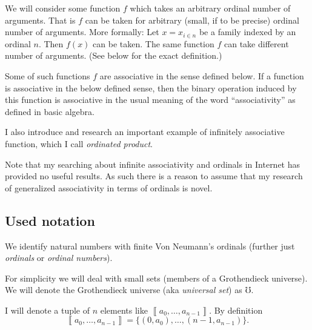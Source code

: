 We will consider some function $f$ which takes an arbitrary ordinal
number of arguments. That is $f$ can be taken for arbitrary (small,
if to be precise) ordinal number of arguments. More formally: Let
$x=x_{i\in n}$ be a family indexed by an ordinal $n$. Then $f(x)$
can be taken. The same function $f$ can take different number of
arguments. (See below for the exact definition.)

Some of such functions $f$ are associative in the sense defined below.
If a function is associative in the below defined sense, then the
binary operation induced by this function is associative in the usual
meaning of the word ``associativity'' as defined in basic algebra.

I also introduce and research an important example of infinitely associative
function, which I call \emph{ordinated product}.

Note that my searching about infinite associativity and ordinals in
Internet has provided no useful results. As such there is a reason
to assume that my research of generalized associativity in terms of
ordinals is novel.


\subsection{Used notation}

We identify natural numbers with finite Von Neumann's
ordinals (further just \emph{ordinals} or \emph{ordinal numbers}).

For simplicity we will deal with small sets (members of a Grothendieck
universe). We will denote the Grothendieck universe (aka \emph{universal
set}) as $\mho$.

I will denote a tuple of $n$ elements like $\left\llbracket a_{0},\ldots,a_{n-1}\right\rrbracket $.
By definition
\[
\left\llbracket a_{0},\ldots,a_{n-1}\right\rrbracket =\{(0,a_{0}),\ldots,(n-1,a_{n-1})\}.
\]


